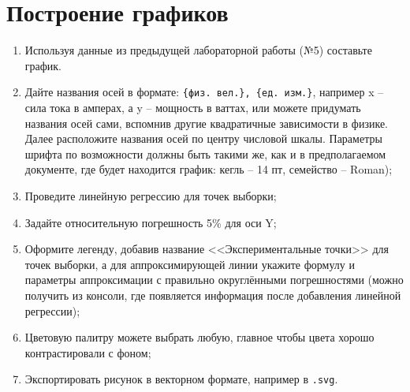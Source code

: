 \documentclass[14pt,a4paper]{article}
\begin{document}
\section{Построение графиков}
\begin{enumerate}
    \item Используя данные из предыдущей лабораторной работы (№5) составьте график. 
    \item Дайте названия осей в формате: \verb|{физ. вел.}, {ед. изм.}|, например x -- сила тока в амперах, а y -- мощность в ваттах, или можете придумать названия осей сами, вспомнив другие квадратичные зависимости в физике. Далее расположите названия осей по центру числовой шкалы. Параметры шрифта по возможности должны быть такими же, как и в предполагаемом документе, где будет находится график: кегль -- 14 пт, семейство -- Roman);
    \item Проведите линейную регрессию для точек выборки;
    \item Задайте относительную погрешность 5\% для оси Y;
    \item Оформите легенду, добавив название <<Экспериментальные точки>> для точек выборки, а для аппроксимирующей линии укажите формулу и параметры аппроксимации с правильно округлёнными погрешностями (можно получить из консоли, где появляется информация после добавления линейной регрессии);
    \item Цветовую палитру можете выбрать любую, главное чтобы цвета хорошо контрастировали с фоном;
    \item Экспортировать рисунок в векторном формате, например в \verb|.svg|.
\end{enumerate}

% 
\end{document}
